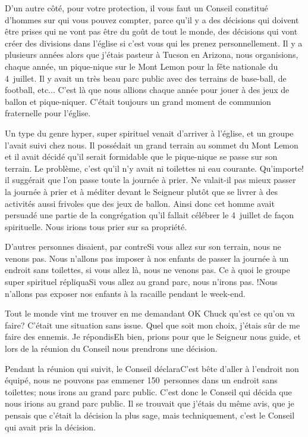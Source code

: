 D’un autre côté, pour votre protection, il vous faut un Conseil constitué d’hommes sur qui vous pouvez compter, parce
qu’il y a des décisions qui doivent être prises qui ne vont pas être du goût de tout le monde, des décisions qui vont
créer des divisions dans l’église si c'est vous qui les prenez personnellement. Il y a plusieurs années alors que j’étais
pasteur à Tucson en Arizona, nous organisions, chaque année, un pique-nique sur le Mont Lemon pour la fête
nationale du 4~juillet. Il y avait un très beau parc public avec des terrains de base-ball, de football, etc... C’est là que
nous allions chaque année pour jouer à des jeux de ballon et pique-niquer. C'était toujours un grand moment de
communion fraternelle pour l'église.

Un type du genre \og hyper, super spirituel\fg{} venait d'arriver à l'église, et un groupe l’avait suivi chez nous. Il possédait
un grand terrain au sommet du Mont Lemon et il avait décidé qu'il serait formidable que le pique-nique se passe sur
son terrain. Le problème, c'est qu'il n’y avait ni toilettes ni eau courante. Qu'importe! il suggérait que l’on passe toute
la journée à prier. Ne valait-il pas mieux passer la journée à prier et à méditer devant le Seigneur plutôt
que se livrer à des activités aussi frivoles que des jeux de ballon. Ainsi donc cet homme avait persuadé une partie de
la congrégation qu'il fallait célébrer le 4~juillet de façon spirituelle. Nous irions tous prier sur sa propriété.

D'autres personnes disaient, par contre\frcolon\og Si vous allez sur son terrain, nous ne venons pas. Nous n’allons pas imposer
à nos enfants de passer la journée à un endroit sans toilettes, si vous allez là, nous ne venons pas. Ce à quoi le
groupe \og super spirituel \fg{} répliqua\frcolon\og Si vous allez au grand parc, nous n’irons pas. !Nous n’allons pas exposer nos
enfants à la racaille pendant le week-end.\fg{}

Tout le monde vint me trouver en me demandant \og OK Chuck qu’est ce qu’on va faire?\fg{} C’était une situation sans
issue. Quel que soit mon choix, j'étais sûr de me faire des ennemis. Je répondis\frcolon\og Eh bien, prions pour que le
Seigneur nous guide, et lors de la réunion du Conseil nous prendrons une décision.\fg{}

Pendant la réunion qui suivit, le Conseil déclara\frcolon\og C’est bête d’aller à l’endroit non équipé, nous ne pouvons pas
emmener 150~personnes dans un endroit sans toilettes; nous irons au grand parc public.\fg{} C’est donc le Conseil qui
décida que nous irions au grand parc public. Il se trouvait que j’étais du même avis, que je pensais que c’était la
décision la plus sage, mais techniquement, c’est le Conseil qui avait pris la décision.

